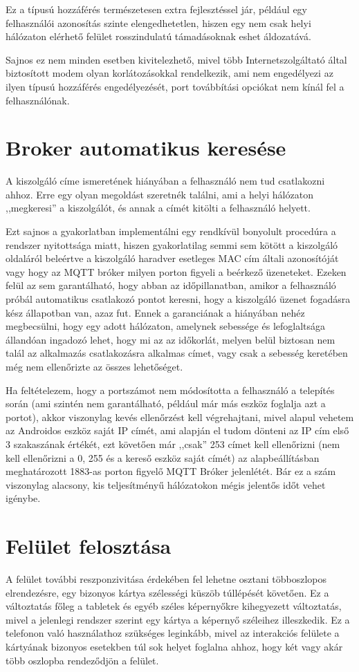 \documentclass[]{thesis-ekf}
\theoremstyle{definition}
\theoremstyle{remark}
\begin{document}
Ez a típusú hozzáférés természetesen extra fejlesztéssel jár, például egy felhasználói azonosítás
szinte elengedhetetlen, hiszen egy nem csak helyi hálózaton elérhető felület rosszindulatú támadásoknak
eshet áldozatává.

Sajnos ez nem minden esetben kivitelezhető, mivel több Internetszolgáltató által biztosított modem
olyan korlátozásokkal rendelkezik, ami nem engedélyezi az ilyen típusú hozzáférés engedélyezését,
port továbbítási opciókat nem kínál fel a felhasználónak.

\section{Broker automatikus keresése}
A kiszolgáló címe ismeretének hiányában a felhasználó nem tud csatlakozni ahhoz. Erre egy olyan megoldást
szeretnék találni, ami a helyi hálózaton ,,megkeresi'' a kiszolgálót, és annak a címét kitölti a felhasználó helyett.

Ezt sajnos a gyakorlatban implementálni egy rendkívül bonyolult procedúra a rendszer nyitottsága miatt, hiszen
gyakorlatilag semmi sem kötött a kiszolgáló oldaláról beleértve a kiszolgáló haradver esetleges MAC cím általi
azonosítóját vagy hogy az MQTT bróker milyen porton figyeli a beérkező üzeneteket. Ezeken felül az sem garantálható,
hogy abban az időpillanatban, amikor a felhasználó próbál automatikus csatlakozó pontot keresni, hogy a kiszolgáló
üzenet fogadásra kész állapotban van, azaz fut. Ennek a garanciának a hiányában nehéz megbecsülni, hogy
egy adott hálózaton, amelynek sebessége és lefoglaltsága állandóan ingadozó lehet, hogy mi az az időkorlát,
melyen belül biztosan nem talál az alkalmazás csatlakozásra alkalmas címet, vagy csak a sebesség keretében
még nem ellenőrizte az összes lehetőséget.

Ha feltételezem, hogy a portszámot nem módosította a felhasználó a telepítés során (ami szintén nem garantálható,
például már más eszköz foglalja azt a portot), akkor viszonylag kevés ellenőrzést kell végrehajtani, mivel alapul
vehetem az Androidos eszköz saját IP címét, ami alapján el tudom dönteni az IP cím első 3 szakaszának értékét,
ezt követően már ,,csak'' 253 címet kell ellenőrizni (nem kell ellenőrizni a 0, 255 és a kereső eszköz saját címét)
az alapbeállításban meghatározott 1883-as porton figyelő MQTT Bróker jelenlétét.
Bár ez a szám viszonylag alacsony, kis teljesítményű hálózatokon mégis jelentős időt vehet igénybe.

\section{Felület felosztása}
A felület további reszponzivitása érdekében fel lehetne osztani többoszlopos elrendezésre, egy bizonyos
kártya szélességi küszöb túllépését követően. Ez a változtatás főleg a tabletek és egyéb széles képernyőkre
kihegyezett változtatás, mivel a jelenlegi rendszer szerint egy kártya a képernyő széleihez illeszkedik.
Ez a telefonon való használathoz szükséges leginkább, mivel az interakciós felülete a kártyának bizonyos
esetekben túl sok helyet foglalna ahhoz, hogy két vagy akár több oszlopba rendeződjön a felület.
\end{document}
